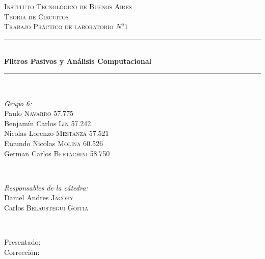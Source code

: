 \begin{titlepage}
\newcommand{\HRule}{\rule{\linewidth}{0.5mm}}
\center
\textsc{\LARGE Instituto Tecnológico de Buenos Aires}\\[1.5cm]
\textsc{\Large Teoria de Circuitos}\\[0.5cm]
\textsc{\large Trabajo Práctico de laboratorio $N^o1$}\\[0.5cm]

\HRule \\[0.4cm]
{ \huge \bfseries Filtros Pasivos y Análisis Computacional}\\[0.1cm] %
\HRule \\[1.5cm]

\begin{minipage}{0.4\textwidth}
\begin{flushleft} \large
\emph{Grupo 6:}\\
Paulo \textsc{Navarro} 57.775\\
Benjamín Carlos \textsc{Lin} 57.242\\
Nicolas Lorenzo  \textsc{Mestanza} 57.521\\
Facundo Nicolas \textsc{Molina} 60.526\\
German Carlos  \textsc{Bertachini} 58.750\\
\end{flushleft}
\end{minipage}
~
\begin{minipage}{0.4\textwidth}
\begin{flushright} \large
\emph{Responsables de la cátedra:} \\
Daniel Andres \textsc{Jacoby}\\
Carlos \textsc{Belaustegui Goitia}\\

\end{flushright}
\end{minipage}\\[4cm]

\begin{minipage}{0.4\textwidth}
\begin{flushleft} \large
Presentado: \\
Corrección:\\
\end{flushleft}
\end{minipage}
\vfill %

\end{titlepage}

